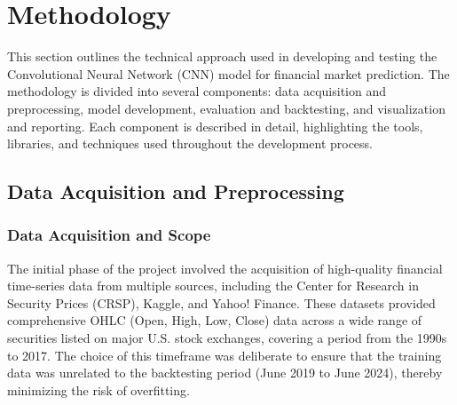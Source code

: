 \doublespacing %

\chapter{Methodology}
\label{ch2}

\begin{spacing}{1} %
\minitoc %
\end{spacing} %
\thesisspacing %

% 

% 


\thesisspacing %


This section outlines the technical approach used in developing and testing the Convolutional Neural Network (CNN) model for financial market prediction. The methodology is divided into several components: data acquisition and preprocessing, model development, evaluation and backtesting, and visualization and reporting. Each component is described in detail, highlighting the tools, libraries, and techniques used throughout the development process.

\section{Data Acquisition and Preprocessing}

\subsection{Data Acquisition and Scope}

The initial phase of the project involved the acquisition of high-quality financial time-series data from multiple sources, including the Center for Research in Security Prices (CRSP), Kaggle, and Yahoo! Finance. These datasets provided comprehensive OHLC (Open, High, Low, Close) data across a wide range of securities listed on major U.S. stock exchanges, covering a period from the 1990s to 2017. The choice of this timeframe was deliberate to ensure that the training data was unrelated to the backtesting period (June 2019 to June 2024), thereby minimizing the risk of overfitting.

